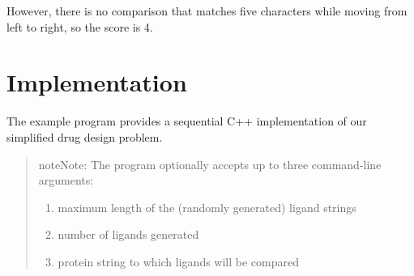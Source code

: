 \documentclass[letterpaper,10pt,openany,oneside]{sphinxmanual}
\begin{document}
However, there is no comparison that matches five characters while moving from left to right, so the score is 4.


\section{Implementation}
\label{sequentialimplementation/sequentialimplementation:implementation}
The example program  provides a sequential C++ implementation of our simplified drug design problem.
\begin{quote}

\begin{notice}{note}{Note:}
The program optionally accepts up to three command-line arguments:
\begin{enumerate}
\item {} 
maximum length of the (randomly generated) ligand strings

\item {} 
number of ligands generated

\item {} 
protein string to which ligands will be compared

\end{enumerate}
\end{notice}
\end{quote}
\end{document}
